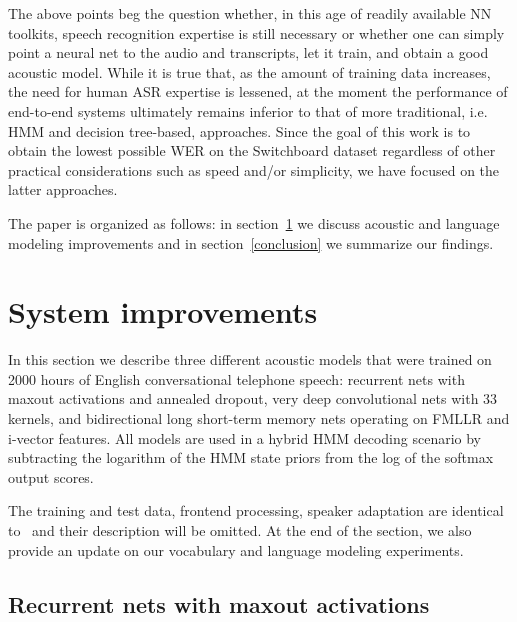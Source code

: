 \documentclass[a4paper]{article}
\begin{document}
The above points beg the question whether, in this age of readily
available NN toolkits, speech recognition expertise is still necessary
or whether one can simply point a neural net to the audio and
transcripts, let it train, and obtain a good acoustic model. While it
is true that, as the amount of training data increases, the need for
human ASR expertise is lessened, at the moment the performance of
end-to-end systems ultimately remains inferior to that of more
traditional, i.e.  HMM and decision tree-based, approaches.  Since the
goal of this work is to obtain the lowest possible WER on the
Switchboard dataset regardless of other practical considerations such
as speed and/or simplicity, we have focused on the latter approaches.

The paper is organized as follows: in section~\ref{sys} we discuss
acoustic and language modeling improvements and in
section~\ref{conclusion} we summarize our findings.

\section{System improvements}
\label{sys}

In this section we describe three different acoustic models that were
trained on 2000 hours of English conversational telephone speech:
recurrent nets with maxout activations and annealed dropout, very deep
convolutional nets with 33 kernels, and bidirectional
long short-term memory nets operating on FMLLR and i-vector features. All
models are used in a hybrid HMM decoding scenario by subtracting the
logarithm of the HMM state priors from the log of the softmax output
scores.

The training and test data,
frontend processing, speaker adaptation are identical to~\cite{saon15}
and their description will be omitted. At the end of the section, we
also provide an update on our vocabulary and language modeling
experiments.

\subsection{Recurrent nets with maxout activations}
\end{document}
